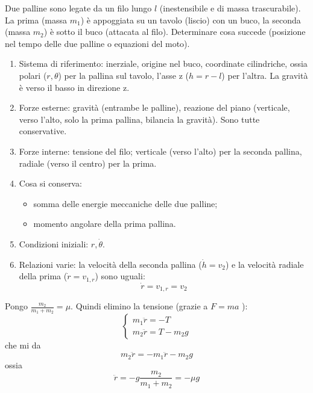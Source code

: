 \documentclass[../main.tex]{subfiles}
\begin{document}

\textex
Due palline sono legate da un filo lungo $l$ (inestensibile e di massa trascurabile). La prima (massa  $m_1$) \`e appoggiata su un tavolo (liscio) con un buco, la seconda (massa  $m_2$) \`e sotto il buco (attacata al filo). Determinare cosa succede (posizione nel tempo delle due palline o equazioni del moto).

\solution
\begin{enumerate}
  \item Sistema di riferimento: inerziale, origine nel buco, coordinate cilindriche, ossia polari ($r,\theta $) per la pallina sul tavolo, l'asse z ($h=r-l$) per l'altra. La gravit\`a \`e verso il basso in direzione z.
  \item Forze esterne: gravit\`a (entrambe le palline), reazione del piano (verticale, verso l'alto, solo la prima pallina, bilancia la gravit\`a). Sono tutte conservative.
  \item Forze interne: tensione del filo; verticale (verso l'alto) per la seconda pallina, radiale (verso il centro) per la prima.
  \item Cosa si conserva:
  \begin{itemize}
    \item somma delle energie meccaniche delle due palline;
    \item momento angolare della prima pallina.
  \end{itemize}
  \item Condizioni iniziali: $r,\dot{\theta }$.
  \item Relazioni varie: la velocit\`a della seconda pallina ($\dot h=v_2$) e la velocit\`a radiale della prima ($\dot r=v_{1,r}$) sono uguali:
  \begin{equation}
    \label{bt:rdot}
    \dot r=v_{1,r}=v_2
  \end{equation}
\end{enumerate}

Pongo  $\frac{m_2}{m_1+m_2}=\mu $. Quindi elimino la tensione (grazie a  $F=ma$ ):
\begin{equation}
  \left\{ \begin{matrix}
    m_1\ddot r=-T \\
    m_2\ddot r=T-m_2g
  \end{matrix} \right .
\end{equation}
che mi da
\begin{equation}
  m_2\ddot r=-m_1\ddot r-m_2g
\end{equation}
ossia
\begin{equation}
  \ddot r=-g\frac{m_2}{m_1+m_2}=-\mu g
\end{equation}
\end{document}
